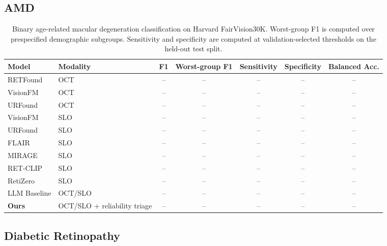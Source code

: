 \subsection{AMD}

\begin{table}[t]
\centering
\caption{Binary age-related macular degeneration classification on Harvard
FairVision30K. Worst-group F1 is computed over prespecified demographic
subgroups. Sensitivity and specificity are computed at validation-selected
thresholds on the held-out test split.}
\label{tab:amd_fairvision30k}
\begin{tabular}{@{}llccccc@{}}
\toprule
\textbf{Model} & \textbf{Modality} & \textbf{F1} &
\textbf{Worst-group F1} & \textbf{Sensitivity} &
\textbf{Specificity} & \textbf{Balanced Acc.} \\
\midrule
RETFound & OCT & -- & -- & -- & -- & -- \\
VisionFM & OCT & -- & -- & -- & -- & -- \\
URFound & OCT & -- & -- & -- & -- & -- \\
VisionFM & SLO & -- & -- & -- & -- & -- \\
URFound & SLO & -- & -- & -- & -- & -- \\
FLAIR & SLO & -- & -- & -- & -- & -- \\
MIRAGE & SLO & -- & -- & -- & -- & -- \\
RET-CLIP & SLO & -- & -- & -- & -- & -- \\
RetiZero & SLO & -- & -- & -- & -- & -- \\
LLM Baseline & OCT/SLO & -- & -- & -- & -- & -- \\
\textbf{Ours} & OCT/SLO + reliability triage & -- & -- & -- & -- & -- \\
\bottomrule
\end{tabular}
\end{table}

\subsection{Diabetic Retinopathy}

